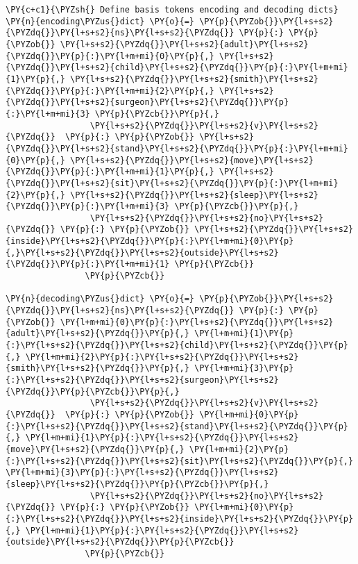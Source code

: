     \begin{tcolorbox}[breakable, size=fbox, boxrule=1pt, pad at break*=1mm,colback=cellbackground, colframe=cellborder]
\begin{Verbatim}[commandchars=\\\{\}]
\PY{c+c1}{\PYZsh{} Define basis tokens encoding and decoding dicts}
\PY{n}{encoding\PYZus{}dict} \PY{o}{=} \PY{p}{\PYZob{}}\PY{l+s+s2}{\PYZdq{}}\PY{l+s+s2}{ns}\PY{l+s+s2}{\PYZdq{}} \PY{p}{:} \PY{p}{\PYZob{}} \PY{l+s+s2}{\PYZdq{}}\PY{l+s+s2}{adult}\PY{l+s+s2}{\PYZdq{}}\PY{p}{:}\PY{l+m+mi}{0}\PY{p}{,} \PY{l+s+s2}{\PYZdq{}}\PY{l+s+s2}{child}\PY{l+s+s2}{\PYZdq{}}\PY{p}{:}\PY{l+m+mi}{1}\PY{p}{,} \PY{l+s+s2}{\PYZdq{}}\PY{l+s+s2}{smith}\PY{l+s+s2}{\PYZdq{}}\PY{p}{:}\PY{l+m+mi}{2}\PY{p}{,} \PY{l+s+s2}{\PYZdq{}}\PY{l+s+s2}{surgeon}\PY{l+s+s2}{\PYZdq{}}\PY{p}{:}\PY{l+m+mi}{3} \PY{p}{\PYZcb{}}\PY{p}{,}
                 \PY{l+s+s2}{\PYZdq{}}\PY{l+s+s2}{v}\PY{l+s+s2}{\PYZdq{}}  \PY{p}{:} \PY{p}{\PYZob{}} \PY{l+s+s2}{\PYZdq{}}\PY{l+s+s2}{stand}\PY{l+s+s2}{\PYZdq{}}\PY{p}{:}\PY{l+m+mi}{0}\PY{p}{,} \PY{l+s+s2}{\PYZdq{}}\PY{l+s+s2}{move}\PY{l+s+s2}{\PYZdq{}}\PY{p}{:}\PY{l+m+mi}{1}\PY{p}{,} \PY{l+s+s2}{\PYZdq{}}\PY{l+s+s2}{sit}\PY{l+s+s2}{\PYZdq{}}\PY{p}{:}\PY{l+m+mi}{2}\PY{p}{,} \PY{l+s+s2}{\PYZdq{}}\PY{l+s+s2}{sleep}\PY{l+s+s2}{\PYZdq{}}\PY{p}{:}\PY{l+m+mi}{3} \PY{p}{\PYZcb{}}\PY{p}{,}
                 \PY{l+s+s2}{\PYZdq{}}\PY{l+s+s2}{no}\PY{l+s+s2}{\PYZdq{}} \PY{p}{:} \PY{p}{\PYZob{}} \PY{l+s+s2}{\PYZdq{}}\PY{l+s+s2}{inside}\PY{l+s+s2}{\PYZdq{}}\PY{p}{:}\PY{l+m+mi}{0}\PY{p}{,}\PY{l+s+s2}{\PYZdq{}}\PY{l+s+s2}{outside}\PY{l+s+s2}{\PYZdq{}}\PY{p}{:}\PY{l+m+mi}{1} \PY{p}{\PYZcb{}}
                \PY{p}{\PYZcb{}}

\PY{n}{decoding\PYZus{}dict} \PY{o}{=} \PY{p}{\PYZob{}}\PY{l+s+s2}{\PYZdq{}}\PY{l+s+s2}{ns}\PY{l+s+s2}{\PYZdq{}} \PY{p}{:} \PY{p}{\PYZob{}} \PY{l+m+mi}{0}\PY{p}{:}\PY{l+s+s2}{\PYZdq{}}\PY{l+s+s2}{adult}\PY{l+s+s2}{\PYZdq{}}\PY{p}{,} \PY{l+m+mi}{1}\PY{p}{:}\PY{l+s+s2}{\PYZdq{}}\PY{l+s+s2}{child}\PY{l+s+s2}{\PYZdq{}}\PY{p}{,} \PY{l+m+mi}{2}\PY{p}{:}\PY{l+s+s2}{\PYZdq{}}\PY{l+s+s2}{smith}\PY{l+s+s2}{\PYZdq{}}\PY{p}{,} \PY{l+m+mi}{3}\PY{p}{:}\PY{l+s+s2}{\PYZdq{}}\PY{l+s+s2}{surgeon}\PY{l+s+s2}{\PYZdq{}}\PY{p}{\PYZcb{}}\PY{p}{,}
                 \PY{l+s+s2}{\PYZdq{}}\PY{l+s+s2}{v}\PY{l+s+s2}{\PYZdq{}}  \PY{p}{:} \PY{p}{\PYZob{}} \PY{l+m+mi}{0}\PY{p}{:}\PY{l+s+s2}{\PYZdq{}}\PY{l+s+s2}{stand}\PY{l+s+s2}{\PYZdq{}}\PY{p}{,} \PY{l+m+mi}{1}\PY{p}{:}\PY{l+s+s2}{\PYZdq{}}\PY{l+s+s2}{move}\PY{l+s+s2}{\PYZdq{}}\PY{p}{,} \PY{l+m+mi}{2}\PY{p}{:}\PY{l+s+s2}{\PYZdq{}}\PY{l+s+s2}{sit}\PY{l+s+s2}{\PYZdq{}}\PY{p}{,} \PY{l+m+mi}{3}\PY{p}{:}\PY{l+s+s2}{\PYZdq{}}\PY{l+s+s2}{sleep}\PY{l+s+s2}{\PYZdq{}}\PY{p}{\PYZcb{}}\PY{p}{,}
                 \PY{l+s+s2}{\PYZdq{}}\PY{l+s+s2}{no}\PY{l+s+s2}{\PYZdq{}} \PY{p}{:} \PY{p}{\PYZob{}} \PY{l+m+mi}{0}\PY{p}{:}\PY{l+s+s2}{\PYZdq{}}\PY{l+s+s2}{inside}\PY{l+s+s2}{\PYZdq{}}\PY{p}{,} \PY{l+m+mi}{1}\PY{p}{:}\PY{l+s+s2}{\PYZdq{}}\PY{l+s+s2}{outside}\PY{l+s+s2}{\PYZdq{}}\PY{p}{\PYZcb{}}
                \PY{p}{\PYZcb{}}
\end{Verbatim}
\end{tcolorbox}

